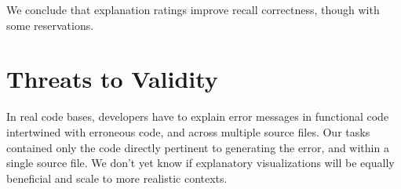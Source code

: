 \documentclass[conference]{IEEEtran}
\begin{document}
We conclude that explanation ratings improve recall correctness, though with some reservations.



\section{Threats to Validity}
\label{sec:threats}


In real code bases, developers have to explain error messages in functional code intertwined with erroneous code, and across multiple source files. Our tasks contained only the code directly pertinent to generating the error, and within a single source file. We don't yet know if explanatory visualizations will be equally beneficial and scale to more realistic contexts.
\end{document}
